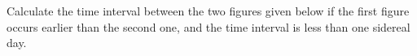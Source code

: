 Calculate the time interval between the two figures given below if the first
figure occurs earlier than the second one, and the time interval is less than
one sidereal day.

